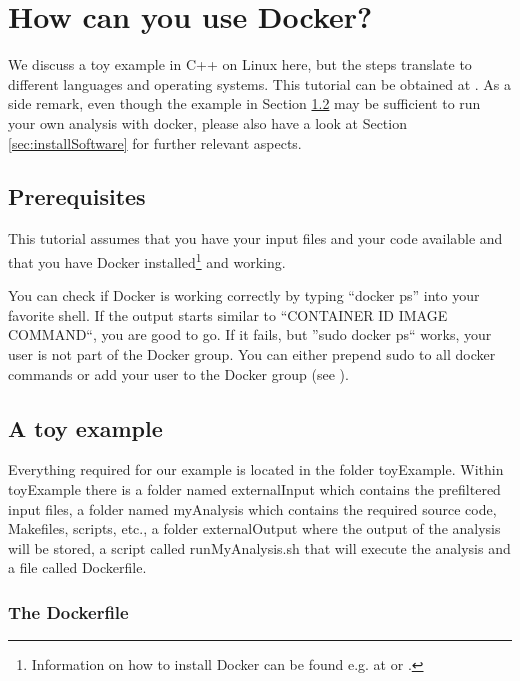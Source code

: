 \documentclass[a4paper, twoside, 11pt]{article}
\begin{document}
\section{How can you use Docker?}

We discuss a toy example in C++ on Linux here, 
but the steps translate to different languages and operating systems. 
This tutorial can be obtained at \cite{gith:tutorial}. 
As a side remark, even though the example in Section \ref{sec:toyexample} 
may be sufficient to run your own analysis with docker, 
please also have a look at Section \ref{sec:installSoftware}  
for further relevant aspects.

\subsection{Prerequisites}
\label{sec:isDockerRunning}

This tutorial assumes that you have your input files and your code available and that you have Docker 
installed\footnote{Information on how to install Docker can be found e.g. at 
\cite{digoc:install}
or \cite{dock:install}
.} and working. 

You can check if Docker is working correctly by typing ``docker ps'' into your favorite shell. 
If the output starts similar to ``CONTAINER ID \hspace{0.5cm} IMAGE \hspace{0.5cm} COMMAND``, you are good to go. 
If it fails, but ''sudo docker ps`` works, your user is not part of the Docker group. 
You can either prepend sudo to all docker commands or add your user to the Docker group (see \cite{digoc:install}). 

\subsection{A toy example}
\label{sec:toyexample}
Everything required for our example is located in the folder toyExample. 
Within toyExample there is a folder named externalInput which contains the prefiltered input files, 
a folder named myAnalysis which contains the required source code, Makefiles, scripts, etc., 
a folder externalOutput where the output of the analysis will be stored, 
a script called runMyAnalysis.sh that will execute the analysis and a file called Dockerfile. 

\subsubsection{The Dockerfile}
\label{sec:dockerfile}
\end{document}
